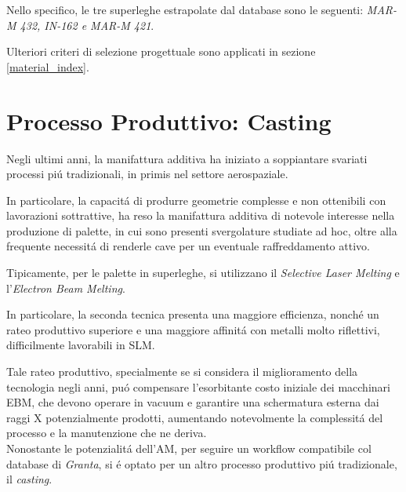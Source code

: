 \documentclass{article}
\begin{document}
        Nello specifico, le tre superleghe estrapolate dal database sono le seguenti:
        \textit{MAR-M 432, IN-162 e MAR-M 421}.

        Ulteriori criteri di selezione progettuale sono applicati in sezione \ref{material_index}.

    \clearpage

    \section{Processo Produttivo: Casting\label{Casting}}

    Negli ultimi anni, la manifattura additiva ha iniziato a soppiantare svariati 
    processi piú tradizionali, in primis nel settore aerospaziale. 

    In particolare, la capacitá di produrre geometrie complesse e non ottenibili
    con lavorazioni sottrattive, ha reso la manifattura additiva di notevole interesse 
    nella produzione di palette, in cui sono presenti svergolature studiate ad hoc, 
    oltre alla frequente necessitá di renderle cave per un eventuale raffreddamento attivo.

    Tipicamente, per le palette in superleghe, si utilizzano il 
    \textit{Selective Laser Melting} e l'\textit{Electron Beam Melting}.
    
    In particolare, la seconda tecnica presenta una maggiore efficienza, nonché un rateo
    produttivo superiore e una maggiore affinitá con metalli molto
    riflettivi, difficilmente lavorabili
    in SLM.
    
    Tale rateo produttivo, specialmente se si considera il miglioramento della tecnologia
    negli anni, puó compensare l'esorbitante costo iniziale dei macchinari EBM, che devono operare in vacuum
    e garantire una schermatura esterna dai raggi X potenzialmente prodotti, aumentando
    notevolmente la complessitá del processo e la manutenzione che ne deriva. \\ 

    Nonostante le potenzialitá dell'AM, per seguire un workflow compatibile col database di \textit{Granta}, si é optato
    per un altro processo produttivo piú tradizionale, il \textit{casting}. 
\end{document}
